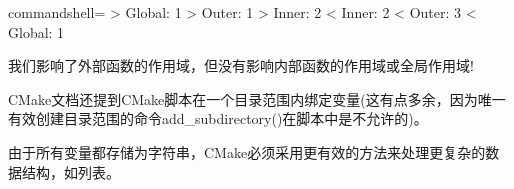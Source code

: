 \begin{tcblisting}{commandshell={}}
> Global: 1
  > Outer: 1
    > Inner: 2
    < Inner: 2
  < Outer: 3
< Global: 1
\end{tcblisting}

我们影响了外部函数的作用域，但没有影响内部函数的作用域或全局作用域!

CMake文档还提到CMake脚本在一个目录范围内绑定变量(这有点多余，因为唯一有效创建目录范围的命令add\_subdirectory()在脚本中是不允许的)。

由于所有变量都存储为字符串，CMake必须采用更有效的方法来处理更复杂的数据结构，如列表。



























